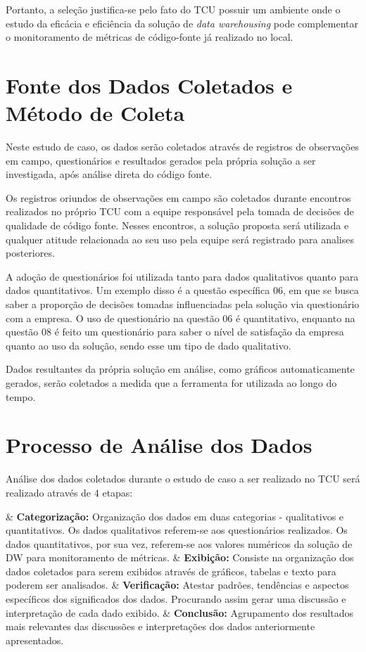 Portanto, a seleção justifica-se pelo fato do TCU possuir um ambiente onde o estudo da eficácia e eficiência da solução de \textit{data warehousing} pode complementar o monitoramento de métricas de código-fonte já realizado no local.



\section{Fonte dos Dados Coletados e Método de Coleta} \label{sec:Fonte e Método de Coleta de Dados}

Neste estudo de caso, os dados serão coletados através de registros de observações em campo, questionários e resultados gerados pela própria solução a ser investigada, após análise direta do código fonte.

Os registros oriundos de observações em campo são coletados durante encontros realizados no próprio TCU com a equipe responsável pela tomada de decisões de qualidade de código fonte. Nesses encontros, a solução proposta será utilizada e qualquer atitude relacionada ao seu uso pela equipe será registrado para analises posteriores.

A adoção de questionários foi utilizada tanto para dados qualitativos quanto para dados quantitativos. Um exemplo disso é a questão específica 06, em que se busca saber a proporção de decisões tomadas influenciadas pela solução via questionário com a empresa. O uso de questionário na questão 06 é quantitativo, enquanto na questão 08 é feito um questionário para saber o nível de satisfação da empresa quanto ao uso da solução, sendo esse um tipo de dado qualitativo.

Dados resultantes da própria solução em análise, como gráficos automaticamente gerados, serão coletados a medida que a ferramenta for utilizada ao longo do tempo.

\section{Processo de Análise dos Dados} \label{sec:Análise}

Análise dos dados coletados durante o estudo de caso a ser realizado no TCU será realizado através de 4 etapas:

\begin{easylist}[itemize]	
	
	& \textbf{Categorização: } Organização dos dados em duas categorias - qualitativos e quantitativos. Os 		dados qualitativos referem-se aos questionários realizados. Os dados quantitativos, por sua vez, 			referem-se aos valores numéricos da solução de DW para monitoramento de métricas. 
	& \textbf{Exibição: } Consiste na organização dos dados coletados para serem exibidos através de 				gráficos, tabelas e texto para poderem ser analisados. 
	& \textbf{Verificação: } Atestar padrões, tendências e aspectos específicos dos significados dos 				dados. Procurando assim gerar uma discussão e interpretação de cada dado exibido.
	& \textbf{Conclusão: } Agrupamento dos resultados mais relevantes das discussões e interpretações dos 			dados anteriormente apresentados.
	
	\end{easylist}

